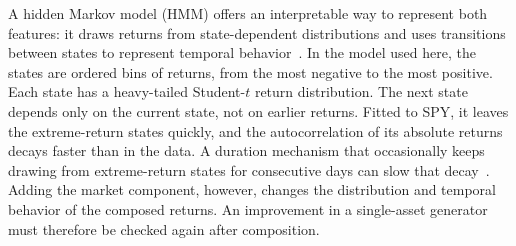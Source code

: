 A hidden Markov model (HMM) offers an interpretable way to represent
both features: it draws returns from state-dependent distributions
and uses transitions between states to represent temporal
behavior~\cite{rabinerJuang1986, rydenTerasvirtaAsbrink1998}. In the
model used here, the states are ordered bins of returns, from the most
negative to the most positive. Each state has a heavy-tailed Student-$t$ return
distribution. The next state depends only on the current state, not
on earlier returns. Fitted to SPY, it
leaves the extreme-return states quickly, and the autocorrelation of
its absolute returns decays faster than in the data. A duration
mechanism that occasionally keeps drawing from extreme-return states
for consecutive days can slow that decay~\cite{bullaBulla2006}.
Adding the market component, however, changes the distribution and
temporal behavior of the composed returns. An improvement in a
single-asset generator must therefore be checked again after
composition.


